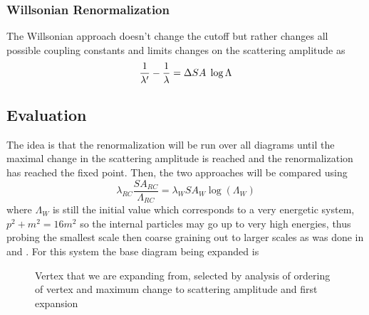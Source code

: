 \documentclass{article}
\begin{document}
\subsubsection{Willsonian Renormalization}
\hspace{0.5 cm} The Willsonian approach doesn't change the cutoff but rather changes all possible coupling constants and limits changes on the scattering amplitude as 
\begin{equation}
 \frac{1}{\lambda'} - \frac{1}{\lambda} = \Delta SA \hspace{0.1 cm} \log \Lambda
 \end{equation}

\subsection{Evaluation}
The idea is that the renormalization will be run over all diagrams until the maximal change in the scattering amplitude is reached and the renormalization has reached the fixed point. 
Then, the two approaches will be compared using 
\begin{equation}
	\lambda_{RC} \frac{SA_{RC}}{\Lambda_{RC}} = \lambda_W SA_{W} \log( \Lambda_W)
	\end{equation}
	where $\Lambda_W$ is still the initial value which corresponds to a very energetic system, $p^2 +m^2 = 16 m^2$ so the internal particles may go up to very high energies, thus probing the smallest scale then coarse graining out to larger scales as was done in \cite{Beny2013} and \cite{Mehta2014}.
For this system the base diagram being expanded is
\begin{figure}[h!]
\begin{center}
	\caption{Vertex that we are expanding from, selected by analysis of ordering of vertex and maximum change to scattering amplitude and first expansion}
	\end{center}
\end{figure} 
\end{document}
